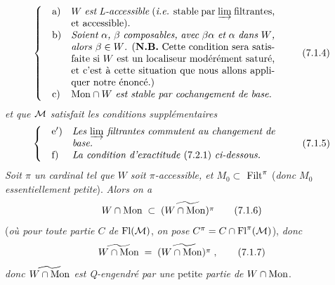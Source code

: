 \[
\left\{
\begin{array}{@{\quad}l@{\quad}p{0.6\textwidth}}
\text{a)} & \textit{$W$ est L-accessible} (\textit{i.e.} stable par $\varinjlim$ filtrantes, et accessible). \\[1.5ex]
\text{b)} & \textit{Soient $\alpha$, $\beta$ composables, avec $\beta\alpha$ et $\alpha$ dans $W$, alors $\beta \in W$.} (\textbf{N.B.} Cette condition sera satisfaite si $W$ est un localiseur modérément saturé, et c'est à cette situation que nous allons appliquer notre énoncé.) \\[1.5ex]
\text{c)} & $\Mon \cap W$ \textit{est stable par cochangement de base.}
\end{array}
\right.
\tag*{(7.1.4)}
\]
\textit{et que $\mathcal{M}$ satisfait les conditions supplémentaires}
\[
\left\{
\begin{array}{@{\quad}l@{\quad}p{0.6\textwidth}}
\text{e$'$)} & \textit{Les $\varinjlim$ filtrantes commutent au changement de base.} \\[1.5ex]
\text{f)} & \textit{La condition d'exactitude} (7.2.1) \textit{ci-dessous.}
\end{array}
\right.
\tag*{(7.1.5)}
\]
\textit{Soit $\pi$ un cardinal tel que $W$ soit $\pi$-accessible, et $M_0 \subset$} $\mathrm{Filt}^{\pi}$ (\textit{donc $M_0$ essentiellement petite}). \textit{Alors on a}
\[
W \cap \mathrm{Mon} \;\subset\; \widetilde{(W \cap \mathrm{Mon})^{\pi}}
\tag*{(7.1.6)}
\]
(\textit{où pour toute partie $C$ de} $\mathrm{Fl}(\mathcal{M})$, \textit{on pose} $C^{\pi} = C \cap \mathrm{Fl}^{\pi}(\mathcal{M})$), \textit{donc}
\[
\widetilde{W \cap \mathrm{Mon}} \;=\; \widetilde{(W \cap \mathrm{Mon})^{\pi}} \;,
\tag*{(7.1.7)}
\]
\textit{donc $\widetilde{W \cap \mathrm{Mon}}$ est Q-engendré par une} petite \textit{partie de} $W \cap \mathrm{Mon}$.

